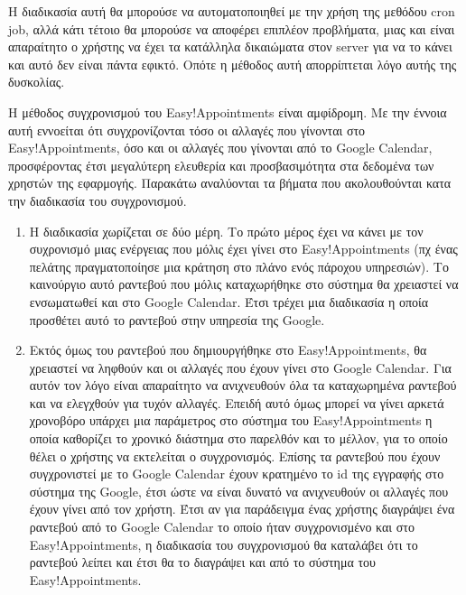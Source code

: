 Η διαδικασία αυτή θα μπορούσε να αυτοματοποιηθεί με την χρήση της μεθόδου cron job, αλλά κάτι τέτοιο θα μπορούσε να αποφέρει επιπλέον προβλήματα, μιας και είναι απαραίτητο ο χρήστης να έχει τα κατάλληλα δικαιώματα στον server για να το κάνει και αυτό δεν είναι πάντα εφικτό. Οπότε η μέθοδος αυτή απορρίπτεται λόγο αυτής της δυσκολίας.

Η μέθοδος συγχρονισμού του Easy!Appointments είναι αμφίδρομη. Με την έννοια αυτή εννοείται ότι συγχρονίζονται τόσο οι αλλαγές που γίνονται στο Easy!Appointments, όσο και οι αλλαγές που γίνονται από το Google Calendar, προσφέροντας έτσι μεγαλύτερη ελευθερία και προσβασιμότητα στα δεδομένα των χρηστών της εφαρμογής. Παρακάτω αναλύονται τα βήματα που ακολουθούνται κατα την διαδικασία του συγχρονισμού.

\begin{enumerate}
\item Η διαδικασία χωρίζεται σε δύο μέρη. Το πρώτο μέρος έχει να κάνει με τον συχρονισμό μιας ενέργειας που μόλις έχει γίνει στο Easy!Appointments (πχ ένας πελάτης πραγματοποίησε μια κράτηση στο πλάνο ενός πάροχου υπηρεσιών). Το καινούργιο αυτό ραντεβού που μόλις καταχωρήθηκε στο σύστημα θα χρειαστεί να ενσωματωθεί και στο Google Calendar. Έτσι τρέχει μια διαδικασία η οποία προσθέτει αυτό το ραντεβού στην υπηρεσία της Google. 
\item Εκτός όμως του ραντεβού που δημιουργήθηκε στο Easy!Appointments, θα χρειαστεί να ληφθούν και οι αλλαγές που έχουν γίνει στο Google Calendar. Για αυτόν τον λόγο είναι απαραίτητο να ανιχνευθούν όλα τα καταχωρημένα ραντεβού και να ελεγχθούν για τυχόν αλλαγές. Επειδή αυτό όμως μπορεί να γίνει αρκετά χρονοβόρο υπάρχει μια παράμετρος στο σύστημα του Easy!Appointments η οποία καθορίζει το χρονικό διάστημα στο παρελθόν και το μέλλον, για το οποίο θέλει ο χρήστης να εκτελείται ο συγχρονισμός. Επίσης τα ραντεβού που έχουν συγχρονιστεί με το Google Calendar έχουν κρατημένο το id της εγγραφής στο σύστημα της Google, έτσι ώστε να είναι δυνατό να ανιχνευθούν οι αλλαγές που έχουν γίνει από τον χρήστη. Έτσι αν για παράδειγμα ένας χρήστης διαγράψει ένα ραντεβού από το Google Calendar το οποίο ήταν συγχρονισμένο και στο Easy!Appointments, η διαδικασία του συγχρονισμού θα καταλάβει ότι το ραντεβού λείπει και έτσι θα το διαγράψει και από το σύστημα του Easy!Appointments.
\end{enumerate}